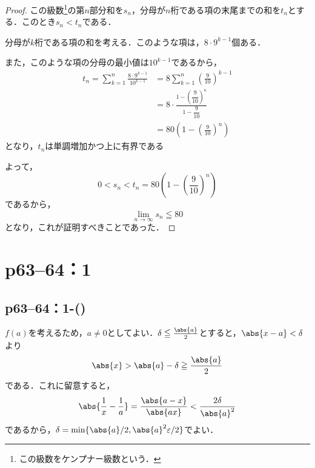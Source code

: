 \documentclass[a4paper,10pt,fleqn]{ltjsarticle}
\begin{document}
\begin{tleftbar}
    \begin{proof}
        この級数\footnote{この級数をケンプナー級数という．}の第$n$部分和を$s_n$，分母が$n$桁である項の末尾までの和を$t_n$とする．このとき$s_n < t_n$である．

        分母が$k$桁である項の和を考える．このような項は，$8 \cdot 9^{k-1}$個ある．

        また，このような項の分母の最小値は$10^{k-1}$であるから，
        \begin{align*}
            t_n = \sum_{k=1}^{n} \frac{8 \cdot 9^{k-1}}{10^{k-1}} & = 8 \sum_{k=1}^{n} \left(\frac{9}{10}\right)^{k-1}               \\
                                                                  & = 8 \cdot \frac{1-\left(\dfrac{9}{10}\right)^n}{1-\dfrac{9}{10}} \\
                                                                  & = 80 \left(1-\left(\frac{9}{10}\right)^n\right)
        \end{align*}
        となり，$t_n$は単調増加かつ上に有界である

        よって，
        \[
            0 < s_n < t_n = 80 \left(1-\left(\frac{9}{10}\right)^n\right)
        \]
        であるから，
        \[
            \lim_{n \to \infty} s_n \leqq 80
        \]
        となり，これが証明すべきことであった．
    \end{proof}
\end{tleftbar}


\newpage


\section*{p63--64：1}

\subsection*{p63--64：1-()}

\begin{tleftbar}
    $f(a)$を考えるため，$a \ne 0$としてよい．$\delta \le \frac{\abs{a}}{2}$とすると，$\abs{x-a}<\delta$より
    \[
        \abs{x} > \abs{a}-\delta \ge \frac{\abs{a}}{2}
    \]
    である．これに留意すると，
    \[
        \abs{\frac{1}{x}-\frac{1}{a}}=\frac{\abs{a-x}}{\abs{ax}} <\frac{2 \delta}{\abs{a}^2}
    \]
    であるから，$\delta = \min \{ \abs{a}/2,\abs{a}^2\varepsilon/2 \}$でよい．
\end{tleftbar}
\end{document}
